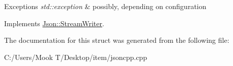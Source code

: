 \begin{DoxyExceptions}{Exceptions}
{\em std\+::exception} & possibly, depending on configuration \\
\hline
\end{DoxyExceptions}


Implements \hyperlink{class_json_1_1_stream_writer_a237368cf13b41decc015640d25f176ab}{Json\+::\+Stream\+Writer}.



The documentation for this struct was generated from the following file\+:\begin{DoxyCompactItemize}
\item 
C\+:/\+Users/\+Mook T/\+Desktop/item/jsoncpp.\+cpp\end{DoxyCompactItemize}
